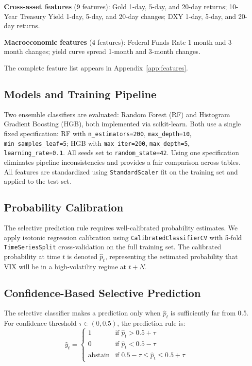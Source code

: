 \documentclass[12pt]{article}
\begin{document}
\textbf{Cross-asset features} (9 features): Gold 1-day, 5-day, and 20-day returns; 10-Year
Treasury Yield 1-day, 5-day, and 20-day changes; DXY 1-day, 5-day, and 20-day returns.

\textbf{Macroeconomic features} (4 features): Federal Funds Rate 1-month and 3-month changes;
yield curve spread 1-month and 3-month changes.

The complete feature list appears in Appendix~\ref{app:features}.

\subsection{Models and Training Pipeline}

Two ensemble classifiers are evaluated: Random Forest (RF) and Histogram Gradient Boosting
(HGB), both implemented via scikit-learn. Both use a single fixed specification: RF with
\texttt{n\_estimators=200}, \texttt{max\_depth=10}, \texttt{min\_samples\_leaf=5};
HGB with \texttt{max\_iter=200}, \texttt{max\_depth=5}, \texttt{learning\_rate=0.1}.
All seeds set to \texttt{random\_state=42}. Using one specification eliminates pipeline inconsistencies
and provides a fair comparison across tables. All features are standardized using
\texttt{StandardScaler} fit on the training set and applied to the test set.

\subsection{Probability Calibration}

The selective prediction rule requires well-calibrated probability estimates. We apply isotonic
regression calibration using \texttt{CalibratedClassifierCV} with 5-fold
\texttt{TimeSeriesSplit} cross-validation on the full training set. The calibrated probability
at time $t$ is denoted $\hat{p}_t$, representing the estimated probability that VIX will be in a
high-volatility regime at $t + N$.

\subsection{Confidence-Based Selective Prediction}

The selective classifier makes a prediction only when $\hat{p}_t$ is sufficiently far from 0.5.
For confidence threshold $\tau \in (0, 0.5)$, the prediction rule is:
\begin{equation}
    \hat{y}_t = \begin{cases}
        1 & \text{if } \hat{p}_t > 0.5 + \tau \\
        0 & \text{if } \hat{p}_t < 0.5 - \tau \\
        \text{abstain} & \text{if } 0.5 - \tau \leq \hat{p}_t \leq 0.5 + \tau
    \end{cases}
    \label{eq:selective}
\end{equation}
\end{document}
